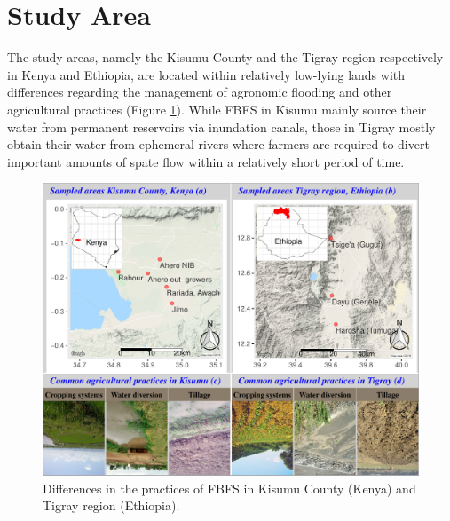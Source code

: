 \documentclass[12pt,oneside]{article}
\begin{document}
\hypertarget{II}{%
\section{Study Area}\label{II}}

The study areas, namely the Kisumu County and the Tigray region respectively in Kenya and Ethiopia, are located within relatively low-lying lands with differences regarding the management of agronomic flooding and other agricultural practices (Figure \ref{fig:fig1}). While FBFS in Kisumu mainly source their water from permanent reservoirs via inundation canals, those in Tigray mostly obtain their water from ephemeral rivers where farmers are required to divert important amounts of spate flow within a relatively short period of time.

\begin{figure}[!htbp]

{\centering \includegraphics[width=1\linewidth,]{figures/Modelling_FBFS_study_area} 

}

\caption{Differences in the practices of FBFS in Kisumu County (Kenya) and Tigray region (Ethiopia).}\label{fig:fig1}
\end{figure}
\end{document}
